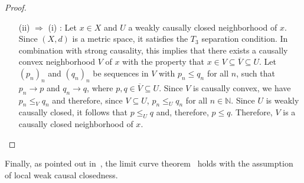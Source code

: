 \documentclass[a4paper,11pt]{article}
\numberwithin{equation}{section}
\theoremstyle{plain}
\theoremstyle{definition}
\newcommand{\N}{\mathbb N}
\begin{document}
\begin{proof}
{\ }\\[-5mm]
\begin{itemize}[fullwidth]
(i) $\Rightarrow$ (ii): Let $x \in X$ and $U$ a causally closed neighborhood of $x$. By strong causality, there exists a causally convex neighborhood $V$ of $x$ with $x \in V \subseteq U$. Let $(p_n)_n$ and $(q_n)_n$ be sequences in $V$ with $p_n \le_V q_n$ for all $n$, such that $p_n \to p \in V$ and $q_n \to q \in V$ as $n \to \infty$. Since $V$ is causally convex, $\le_V \, = \left. \le \right|_{V \times V}$, so $p_n \le q_n$. Therefore, since $U$ is causally closed and $p, q \in V \subseteq U$, we have $p \le q$. Since $p, q \in V$ and $\le_V \, = \left. \le \right|_{V \times V}$, it follows that $p \le_V q$. Hence, $V$ is a weakly causally closed neighborhood of $x$. 

\item[(ii) $\Rightarrow$ (i)]: Let $x \in X$ and $U$ a weakly causally closed neighborhood of $x$. Since $(X, d)$ is a metric space, it satisfies the $T_3$ separation condition. In combination with strong causality, this implies that there exists a causally convex neighborhood $V$ of $x$ with the property that $x \in V \subseteq \overline{V} \subseteq U$. Let $(p_n)_n$ and $(q_n)_n$ be sequences in $V$ with $p_n \le q_n$ for all $n$, such that $p_n \to p$ and $q_n \to q$, where $p, q \in \overline{V} \subseteq U$. Since $V$ is causally convex, we have $p_n \le_V q_n$ and therefore, since $V \subseteq U$, $p_n \le_U q_n$ for all $n \in \N$. Since $U$ is weakly causally closed, it follows that $p \le_U q$ and, therefore, $p \le q$. Therefore, $V$ is a causally closed neighborhood of $x$.
\qedhere
\end{itemize}
\end{proof}

Finally, as pointed out in~\cite[pp.~8]{hau2020causal}, the limit curve theorem~\cite[Thm.\ 3.7]{kunzinger2018lorentzian} holds with the assumption of local weak causal closedness.%
\end{document}
